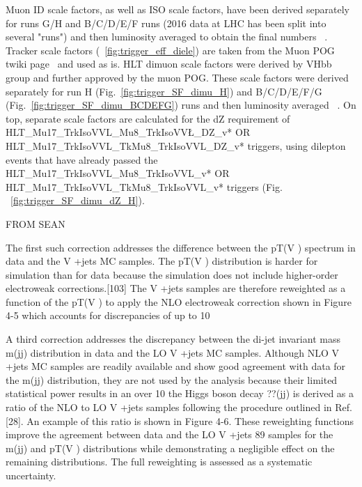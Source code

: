 Muon ID scale factors, as well as ISO scale factors, have been derived separately for runs G/H and B/C/D/E/F runs (2016 data at LHC has been split into several "runs") and then luminosity averaged to obtain the final numbers ~\cite{muonIDnISO}. Tracker scale factors (~\ref{fig:trigger_eff_diele}) are taken from the Muon POG twiki page~\cite{muonTRK} and used as is. HLT dimuon scale factors were derived by VHbb group and further approved by the muon POG. These scale factors were derived separately for run H (Fig.~\ref{fig:trigger_SF_dimu_H}) and B/C/D/E/F/G (Fig.~\ref{fig:trigger_SF_dimu_BCDEFG}) runs and then luminosity averaged ~\cite{muonTrigger}. On top, separate scale factors are calculated for the dZ requirement of HLT\_Mu17\_TrkIsoVVL\_Mu8\_TrkIsoVV\L\_DZ\_v* OR HLT\_Mu17\_TrkIsoVVL\_TkMu8\_TrkIsoVVL\_DZ\_v* triggers, using dilepton events that have already passed the HLT\_Mu17\_TrkIsoVVL\_Mu8\_TrkIsoVVL\_v* OR HLT\_Mu17\_TrkIsoVVL\_TkMu8\_TrkIsoVVL\_v* triggers (Fig. ~\ref{fig:trigger_SF_dimu_dZ_H}).





FROM SEAN

The first such correction addresses the difference between the pT(V ) spectrum in data and the V +jets MC samples. The pT(V ) distribution is harder for simulation than for data because the simulation does not include higher-order electroweak corrections.[103] The V +jets samples are therefore reweighted as a function of the pT(V ) to apply the NLO electroweak correction shown in Figure 4-5 which accounts for discrepancies of up to 10%

A third correction addresses the discrepancy between the di-jet invariant mass m(jj)
distribution in data and the LO V +jets MC samples. Although NLO V +jets MC samples are readily available and show good agreement with data for the m(jj) distribution, they are not used by the analysis because their limited statistical power results in an over 10%
the Higgs boson decay ??(jj) is derived as a ratio of the NLO to LO V +jets samples following the procedure outlined in Ref. [28]. An example of this ratio is shown in Figure 4-6. These reweighting functions improve the agreement between data and the LO V +jets
89
samples for the m(jj) and pT(V ) distributions while demonstrating a negligible effect on the remaining distributions. The full reweighting is assessed as a systematic uncertainty.






